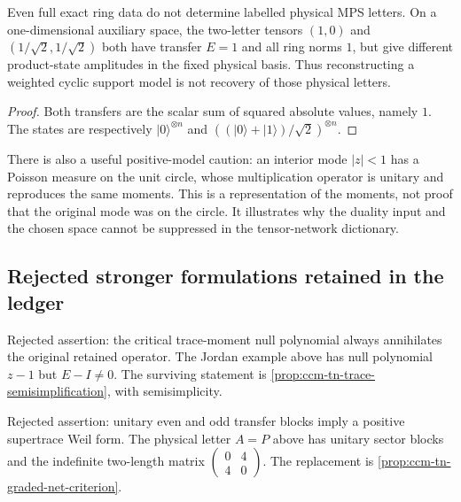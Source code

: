 \begin{observation}
\label{obs:ccm-tn-no-letter-reconstruction}
Even full exact ring data do not determine labelled physical MPS
letters. On a one-dimensional auxiliary space, the two-letter tensors
$(1,0)$ and $(1/\sqrt2,1/\sqrt2)$ both have transfer $E=1$ and all
ring norms $1$, but give different product-state amplitudes in the
fixed physical basis. Thus reconstructing a weighted cyclic support
model is not recovery of those physical letters.
\end{observation}
\begin{proof}
Both transfers are the scalar sum of squared absolute values, namely
$1$. The states are respectively $|0\rangle^{\otimes n}$ and
$((|0\rangle+|1\rangle)/\sqrt2)^{\otimes n}$.
\end{proof}

There is also a useful positive-model caution: an interior mode
$|z|<1$ has a Poisson measure on the unit circle, whose multiplication
operator is unitary and reproduces the same moments. This is a
representation of the moments, not proof that the original mode was
on the circle. It illustrates why the duality input and the chosen
space cannot be suppressed in the tensor-network dictionary.

\subsection{Rejected stronger formulations retained in the ledger}

\begin{observation}
\label{obs:ccm-tn-unqualified-kernel}
Rejected assertion: the critical trace-moment null polynomial always
annihilates the original retained operator. The Jordan example above
has null polynomial $z-1$ but $E-I\ne0$. The surviving statement is
\cref{prop:ccm-tn-trace-semisimplification}, with semisimplicity.
\end{observation}

\begin{observation}
\label{obs:ccm-tn-positive-supertrace}
Rejected assertion: unitary even and odd transfer blocks imply a
positive supertrace Weil form. The physical letter $A=P$ above has
unitary sector blocks and the indefinite two-length matrix
$\left(\begin{smallmatrix}0&4\\4&0\end{smallmatrix}\right)$.
The replacement is \cref{prop:ccm-tn-graded-net-criterion}.
\end{observation}
